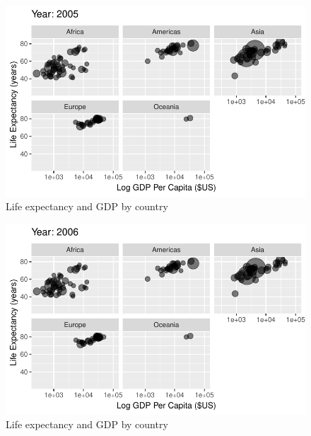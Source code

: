 \documentclass[
  letterpaper,
  DIV=11,
  numbers=noendperiod]{scrreport}
\theoremstyle{definition}
\theoremstyle{remark}
\begin{document}
\begin{figure}

{\centering \includegraphics{index_files/figure-pdf/fig-anim-lifegdp-97.pdf}

}

\caption{\label{fig-anim-lifegdp-97}Life expectancy and GDP by country}

\end{figure}

\begin{figure}

{\centering \includegraphics{index_files/figure-pdf/fig-anim-lifegdp-98.pdf}

}

\caption{\label{fig-anim-lifegdp-98}Life expectancy and GDP by country}

\end{figure}
\end{document}
